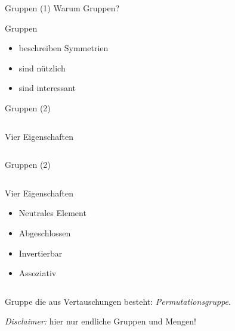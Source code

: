 \begin{frame}{Gruppen (1)}
Warum Gruppen?

\pause
Gruppen
\begin{itemize}
\item beschreiben Symmetrien
\item sind nützlich
\pause
\item sind interessant
\end{itemize}
\end{frame}


\begin{frame}{Gruppen (2)}
\begin{columns}
\begin{column}{0.4\textwidth}
Vier Eigenschaften
\vspace{6.65em}
\end{column}
\begin{column}{0.5\textwidth}
\begin{center}
\end{center}
\end{column}
\end{columns}
\vspace{1.4em}
\end{frame}

\begin{frame}[noframenumbering]{Gruppen (2)}
\begin{columns}
\begin{column}{0.4\textwidth}
Vier Eigenschaften
\begin{itemize}
\item Neutrales Element
\pause
\item Abgeschlossen
\pause
\item Invertierbar
\pause
\item Assoziativ
\end{itemize}
\end{column}
\begin{column}{0.5\textwidth}
\begin{center}
\end{center}
\end{column}
\end{columns}
\vspace{-2em}
\pause
Gruppe die aus Vertauschungen besteht:
\emph{Permutationsgruppe}.

\pause
\emph{Disclaimer:} hier nur endliche Gruppen und Mengen!
\end{frame}

